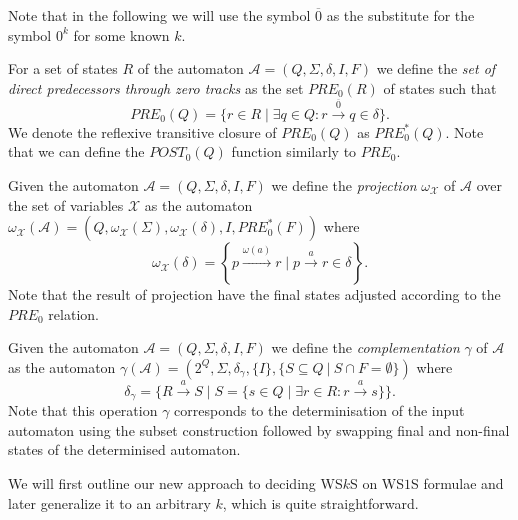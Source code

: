 Note that in the following we will use the symbol $\overline{0}$ as the
substitute for the symbol $0^k$ for some known $k$.

\begin{defz}
For a set of states $R$ of the automaton $\mathcal{A} = (Q, \Sigma, \delta, I,
F)$ we define the \emph{set of direct predecessors through zero tracks} as the
set $\mathit{PRE}_0(R)$ of states such that
\begin{equation}
 \mathit{PRE}_0(Q) = \{r \in R \mid \exists q \in Q: r
 \overset{\overline{0}}{\longrightarrow} q \in \delta\}.
\end{equation}
We denote the reflexive transitive closure of $PRE_0(Q)$ as $PRE_0^*(Q)$. Note
that we can define the $POST_0(Q)$ function similarly to $PRE_0$.
\end{defz}

\begin{defz}
 Given the automaton $\mathcal{A} = (Q, \Sigma, \delta, I, F)$ we define the
 \emph{projection} $\omega_\mathcal{X}$ of $\mathcal{A}$ over the set of
 variables $\mathcal{X}$ as the automaton $\omega_\mathcal{X}(\mathcal{A}) = (Q,
 \omega_{\mathcal{X}}(\Sigma), \omega_{\mathcal{X}}(\delta), I, PRE_0^*(F))$
 where
 \begin{equation}
  \omega_{\mathcal{X}}(\delta) = \left\{ p \overset{\omega(a)}{\longrightarrow}
  r \mid p \overset{a}{\rightarrow} r \in \delta\right\}.
 \end{equation}
 Note that the result of projection have the final states adjusted
 according to the $PRE_0$ relation.
\end{defz}

\begin{defz}
 Given the automaton $\mathcal{A} = (Q, \Sigma, \delta, I, F)$ we define the
 \emph{complementation} $\gamma$ of $\mathcal{A}$ as the automaton
 $\gamma(\mathcal{A}) = (2^Q, \Sigma, \delta_\gamma, \{I\}, \{S \subseteq Q\
 |\ S \cap F = \emptyset\})$ where
 \begin{equation}
  \delta_\gamma = \{R \overset{a}{\rightarrow} S \mid S = \{s \in Q \mid \exists
  r \in R: r \overset{a}{\rightarrow} s\}\}.
 \end{equation}
 Note that this operation $\gamma$ corresponds to the determinisation of the
 input automaton using the subset construction followed by swapping final and
 non-final states of the determinised automaton.
\end{defz}

We will first outline our new approach to deciding WS$k$S on WS$1$S formulae and
later generalize it to an arbitrary $k$, which is quite straightforward.

